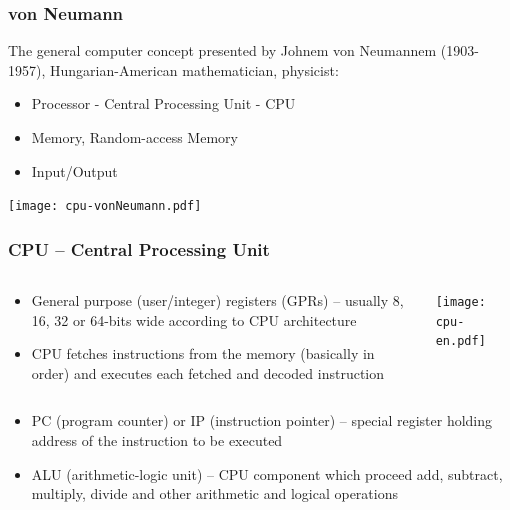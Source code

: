 \documentclass{beamer}
\begin{document}
\begin{frame}
\frametitle{von Neumann}

The general computer concept presented by Johnem von Neumannem (1903-1957), Hungarian-American mathematician, physicist:
\begin{itemize}
\item Processor - Central Processing Unit - CPU
\item Memory, Random-access Memory
\item Input/Output
\end{itemize}
\begin{center}
   \texttt{[image: cpu-vonNeumann.pdf]}
\end{center}

\end{frame}


\begin{frame}
\frametitle{CPU -- Central Processing Unit}
\begin{columns}
\begin{column}{0.50\textwidth}
\begin{itemize}
\item General purpose (user/integer) registers (GPRs) -- usually 8, 16, 32 or 64-bits wide according to CPU architecture
\item CPU fetches instructions from the memory (basically in order) and executes each fetched and decoded instruction
\end{itemize}
\end{column}
\begin{column}{0.50\textwidth}  
\begin{center}
   \texttt{[image: cpu-en.pdf]}
\end{center}
\end{column}
\end{columns}
\begin{itemize}
\item PC (program counter) or IP (instruction pointer) -- special register holding address of the instruction to be executed
\item ALU (arithmetic-logic unit) -- CPU component which proceed add, subtract, multiply, divide and other arithmetic and logical operations
\end{itemize}

\end{frame}
\end{document}
